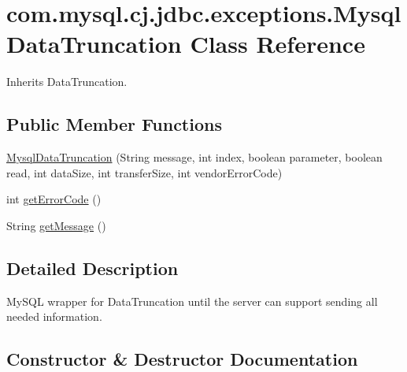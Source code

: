 \hypertarget{classcom_1_1mysql_1_1cj_1_1jdbc_1_1exceptions_1_1_mysql_data_truncation}{}\section{com.\+mysql.\+cj.\+jdbc.\+exceptions.\+Mysql\+Data\+Truncation Class Reference}
\label{classcom_1_1mysql_1_1cj_1_1jdbc_1_1exceptions_1_1_mysql_data_truncation}


Inherits Data\+Truncation.

\subsection*{Public Member Functions}
\begin{DoxyCompactItemize}
\item 
\mbox{\hyperlink{classcom_1_1mysql_1_1cj_1_1jdbc_1_1exceptions_1_1_mysql_data_truncation_afc998a9007a27ce2636aae9668d573c4}{Mysql\+Data\+Truncation}} (String message, int index, boolean parameter, boolean read, int data\+Size, int transfer\+Size, int vendor\+Error\+Code)
\item 
int \mbox{\hyperlink{classcom_1_1mysql_1_1cj_1_1jdbc_1_1exceptions_1_1_mysql_data_truncation_a373827e2e03f041bfd9ee0d882b07b60}{get\+Error\+Code}} ()
\item 
String \mbox{\hyperlink{classcom_1_1mysql_1_1cj_1_1jdbc_1_1exceptions_1_1_mysql_data_truncation_a9879279a524e5c4f03fba46107925891}{get\+Message}} ()
\end{DoxyCompactItemize}


\subsection{Detailed Description}
My\+S\+QL wrapper for Data\+Truncation until the server can support sending all needed information. 

\subsection{Constructor \& Destructor Documentation}
\mbox{\label{classcom_1_1mysql_1_1cj_1_1jdbc_1_1exceptions_1_1_mysql_data_truncation_afc998a9007a27ce2636aae9668d573c4}} 
